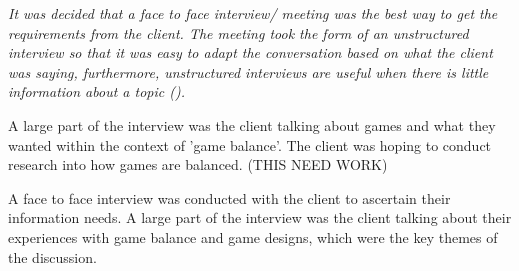 \textit{It was decided that a face to face interview/ meeting was the best way to get the requirements from the client. The meeting took the form of an unstructured interview so that it was easy to adapt the conversation based on what the client was saying, furthermore, unstructured interviews are useful when there is little information about a topic (\cite{easwaramoorthy2006interviewing}). }

A large part of the interview was the client talking about games and what they wanted within the context of 'game balance'.  The client was hoping to conduct research into how games are balanced. (THIS NEED WORK)

A face to face interview was conducted with the client to ascertain their information needs. A large part of the interview was the client talking about their experiences with game balance and game designs, which were the key themes of the discussion. 